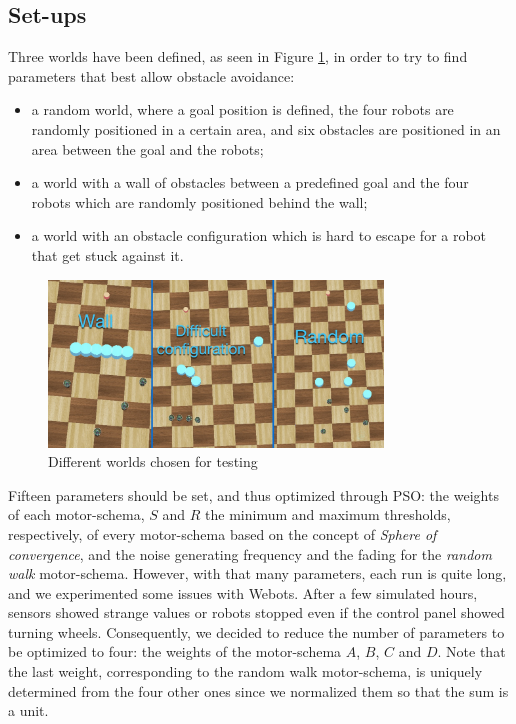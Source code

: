 \documentclass[journal]{IEEEtran}
\begin{document}
\subsection{Set-ups}
Three worlds have been defined, as seen in Figure \ref{img:worlds}, in order to try to find parameters that best allow obstacle avoidance:
\begin{itemize}
\item[1.] a random world, where a goal position is defined, the four robots are randomly positioned in a certain area, and six obstacles are positioned in an area between the goal and the robots;
\item[2.] a world with a wall of obstacles between a predefined goal and the four robots which are randomly positioned behind the wall;
\item[3.] a world with an obstacle configuration which is hard to escape for a robot that get stuck against it. 
\end{itemize}
\begin{figure}[!t]
\centering
\includegraphics[width=3.5in]{Images/world.jpg}
\caption{Different worlds chosen for testing}
\label{img:worlds}
\end{figure}
Fifteen parameters should be set, and thus optimized through PSO: the weights of each motor-schema, $S$ and $R$ the minimum and maximum thresholds, respectively, of every motor-schema based on the concept of \textit{Sphere of convergence}, and the noise generating frequency and the fading for the \textit{random walk} motor-schema. 
However, with that many parameters, each run is quite long, and we experimented some issues with Webots\textregistered. After a few simulated hours, sensors showed strange values or robots stopped even if the control panel showed turning wheels. Consequently, we decided to reduce the number of parameters to be optimized to four: the weights of the motor-schema $A$, $B$, $C$ and $D$. Note that the last weight, corresponding to the random walk motor-schema, is uniquely determined from the four other ones since we normalized them so that the sum is a unit.
\end{document}
